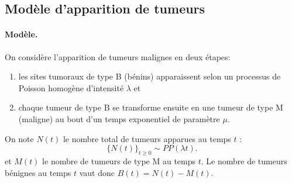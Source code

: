\subsection{Modèle d'apparition de tumeurs}


\paragraph{Modèle.}
On considère l'apparition de tumeurs malignes en deux étapes:
\begin{enumerate}
  \item les sites tumoraux de type B (bénins) apparaissent selon un processus de Poisson homogène d'intensité $\lambda$ et
  \item chaque tumeur de type B se transforme ensuite en une tumeur de type M (maligne) au bout d'un temps exponentiel de paramètre $\mu$.
\end{enumerate}

On note $N(t)$ le nombre total de tumeurs apparues au temps $t$ : 
$$
\{N(t)\}_{t \geq 0} \sim PP(\lambda t).
$$
et $M(t)$ le nombre de tumeurs de type M au temps $t$. Le nombre de tumeurs bénignes au temps $t$ vaut donc $B(t) = N(t) - M(t)$.

\bigskip
